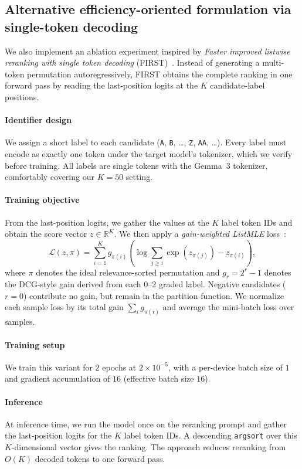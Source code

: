 \documentclass[pdflatex,sn-basic,Numbered]{sn-jnl}%
\theoremstyle{thmstyleone}%
\theoremstyle{thmstyletwo}%
\theoremstyle{thmstylethree}%
\begin{document}
\subsection{Alternative efficiency-oriented formulation via single-token decoding}

We also implement an ablation experiment inspired by \textit{Faster improved listwise reranking with single token
decoding} (FIRST)~\cite{Reddy}. Instead of generating a multi-token permutation
autoregressively, FIRST obtains the complete ranking in one forward pass by
reading the last-position logits at the $K$ candidate-label positions.

\paragraph{Identifier design} We assign a short label to each candidate
(\texttt{A}, \texttt{B}, \dots, \texttt{Z}, \texttt{AA}, \dots). Every label
must encode as exactly one token under the target model's tokenizer, which we
verify before training. All labels are single tokens with the Gemma~3 tokenizer,
comfortably covering our $K = 50$ setting.

\paragraph{Training objective} From the last-position logits, we gather the values
at the $K$ label token IDs and obtain the score vector
$z \in \mathbb{R}^K$. We then apply a \emph{gain-weighted ListMLE}
loss~\cite{Xia}:
\[
\mathcal{L}(z, \pi) = \sum_{i=1}^{K} g_{\pi(i)} \left(
\log \sum_{j \ge i} \exp(z_{\pi(j)}) - z_{\pi(i)} \right),
\]
where $\pi$ denotes the ideal relevance-sorted permutation and
$g_r = 2^r - 1$ denotes the DCG-style gain derived from each 0--2 graded label.
Negative candidates ($r = 0$) contribute no gain, but remain in the partition
function. We normalize each sample loss by its total gain
$\sum_i g_{\pi(i)}$ and average the mini-batch loss over samples.

\paragraph{Training setup} We train this variant for $2$ epochs at
$2 \times 10^{-5}$, with a per-device batch size of $1$ and gradient
accumulation of $16$ (effective batch size $16$).

\paragraph{Inference} At inference time, we run the model once on the reranking
prompt and gather the last-position logits for the $K$ label token IDs. A
descending \texttt{argsort} over this $K$-dimensional vector gives the ranking.
The approach reduces reranking from $O(K)$ decoded tokens to one forward pass.
\end{document}
